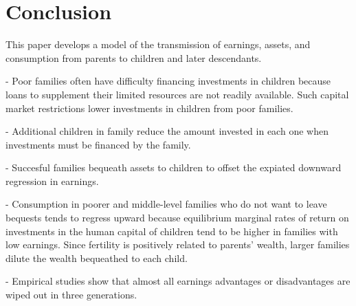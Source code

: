 \documentclass[11pt]{article}
\begin{document}
\section{Conclusion}
This paper develops a model of the transmission of earnings, assets, and consumption from parents to children and later descendants. 

- Poor families often have difficulty financing investments in children because loans to supplement their limited resources are not readily available. Such capital market restrictions lower investments in children from poor families. 

- Additional children in family reduce the amount invested in each one when investments must be financed by the family. 

- Succesful families bequeath assets to children to offset the expiated downward regression in earnings. 

- Consumption in poorer and middle-level families who do not want to leave bequests tends to regress upward because equilibrium marginal rates of return on investments in the human capital of children tend to be higher in families with low earnings. Since fertility is positively related to parents' wealth, larger families dilute the wealth bequeathed to each child. 

- Empirical studies show that almost all earnings advantages or disadvantages are wiped out in three generations. 


 
\end{document}

